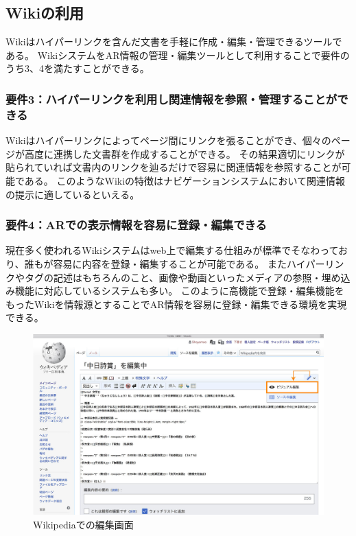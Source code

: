 \subsection{Wikiの利用}
Wikiはハイパーリンクを含んだ文書を手軽に作成・編集・管理できるツールである。
WikiシステムをAR情報の管理・編集ツールとして利用することで要件のうち3、4を満たすことができる。

\subsubsection*{要件3：ハイパーリンクを利用し関連情報を参照・管理することができる}
Wikiはハイパーリンクによってページ間にリンクを張ることができ、個々のページが高度に連携した文書群を作成することができる。
その結果適切にリンクが貼られていれば文書内のリンクを辿るだけで容易に関連情報を参照することが可能である。
このようなWikiの特徴はナビゲーションシステムにおいて関連情報の提示に適しているといえる。

\subsubsection*{要件4：ARでの表示情報を容易に登録・編集できる}
現在多く使われるWikiシステムはweb上で編集する仕組みが標準でそなわっており、誰もが容易に内容を登録・編集することが可能である。
またハイパーリンクやタグの記述はもちろんのこと、画像や動画といったメディアの参照・埋め込み機能に対応しているシステムも多い。
このように高機能で登録・編集機能をもったWikiを情報源とすることでAR情報を容易に登録・編集できる環境を実現できる。

\begin{figure}[h]
  \centering
  \includegraphics[width=120mm]{images/wikipedia_edit.png}
  \caption{Wikipediaでの編集画面} \label{fig:wikipedia_edit}
\end{figure}

